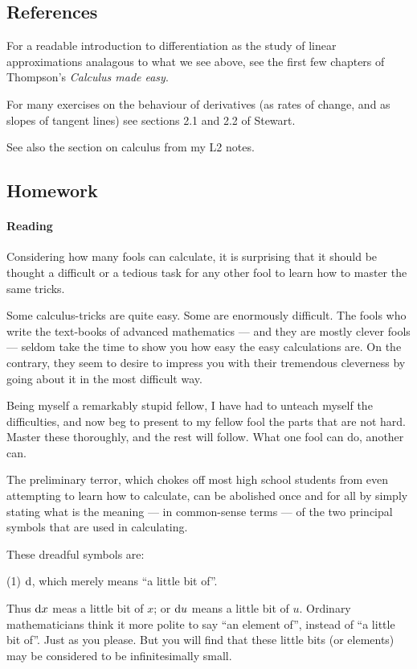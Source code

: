 \subsection{References}
For a readable introduction to differentiation as the study of linear approximations analagous
to what we see above, see the first few chapters of Thompson's \emph{Calculus made easy}.

For many exercises on the behaviour of derivatives (as rates of change, and as slopes of tangent
lines) see sections 2.1 and 2.2 of Stewart.

See also the section on calculus from my L2 notes.

\subsection{Homework}
\paragraph{Reading}
Considering how many fools can calculate, it is surprising that it should be thought a difficult or
a tedious task for any other fool to learn how to master the same tricks.

Some calculus-tricks are quite easy. Some are enormously difficult. The fools who write the text-books
of advanced mathematics --- and they are mostly clever fools --- seldom take the time to show you how
easy the easy calculations are. On the contrary, they seem to desire to impress you with their tremendous
cleverness by going about it in the most difficult way.

Being myself a remarkably stupid fellow, I have had to unteach myself the difficulties, and now beg
to present to my fellow fool the parts that are not hard. Master these thoroughly, and the rest will
follow. What one fool can do, another can.

The preliminary terror, which chokes off most high school students from even attempting to learn
how to calculate, can be abolished once and for all by simply stating what is the meaning --- in
common-sense terms --- of the two principal symbols that are used in calculating.

These dreadful symbols are:

(1) $ \dif{} $, which merely means ``a little bit of''.

Thus $ \dif{x} $ meas a little bit of $ x $;
or $ \dif{u} $ means a little bit of $ u $. Ordinary mathematicians think it more polite to say
``an element of'', instead of ``a little bit of''. Just as you please. But you will find that these
little bits (or elements) may be considered to be infinitesimally small.

